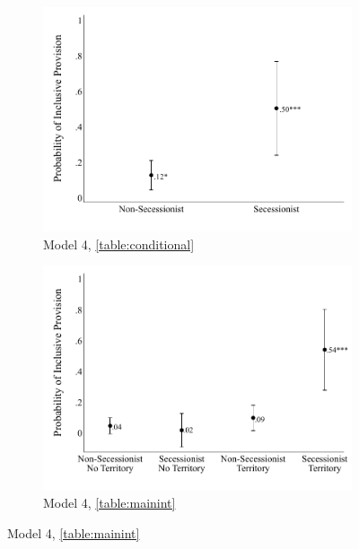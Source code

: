 \documentclass[12pt, letterpaper]{article}
\begin{document}
\newpage
\begin{figure}[h!]
\renewcommand\thefigure{A.\arabic{figure}}
\caption{\textbf{Predicted Effect of Secessionism on Inclusive Services}}
\label{figure:main}
\centering
	\begin{subfigure}{0.45\textwidth}
    \centering
    \caption{Model 4, \autoref{table:conditional}} \label{figure:mainc}
    \includegraphics[width=\textwidth]{main.pdf}
    \end{subfigure}
% 
	\begin{subfigure}{0.45\textwidth}
    \centering
    \caption{Model 4, \autoref{table:mainint}} \label{figure:mainint}
    \includegraphics[width=\textwidth]{mainint.pdf}
    \end{subfigure}
  \begin{tablenotes}

\end{tablenotes}
\end{figure}
\end{document}
